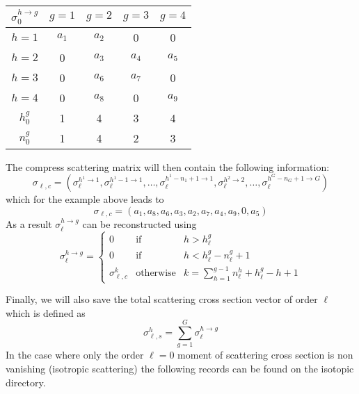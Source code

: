 \begin{center}
\begin{tabular}{c||cccc}
$\sigma_{0}^{h\to g}$ &$g=1$   & $g=2$   & $g=3$   & $g=4$    \\ \hline\hline
$h=1$                 & $a_{1}$ & $a_{2}$ & 0       & 0        \\
$h=2$                 & 0       & $a_{3}$ & $a_{4}$ & $a_{5}$  \\
$h=3$                 & 0       & $a_{6}$ & $a_{7}$ & 0        \\
$h=4$                 & 0       & $a_{8}$ & 0       & $a_{9}$  \\ \hline\hline
$h_{0}^{g}$           & 1       & 4       & 3       & 4       \\
$n_{0}^{g}$           & 1       & 4       & 2       & 3        \\
\end{tabular}
\end{center}

The compress scattering matrix will then contain the following information:
  \begin{displaymath}
    \sigma_{\ell,c}=\left(\sigma_{\ell}^{h^{1}\to 1},\sigma_{\ell}^{h^{1}-1\to 1},
    \ldots,\sigma_{\ell}^{h^{1}-n_{1}+1\to 1},\sigma_{\ell}^{h^{2}\to
    2},\ldots,\sigma_{\ell}^{h^{G}-n_{G}+1\to G}\right)
  \end{displaymath}
which for the example above leads to
  \begin{displaymath}
    \sigma_{\ell,c}=\left(a_{1},a_{8},a_{6},
                     a_{3},a_{2},a_{7},a_{4},a_{9},0,a_{5}\right)
  \end{displaymath}
As a result $\sigma_{\ell}^{h\to g}$ can be
reconstructed using 
\begin{displaymath}
\sigma_{\ell}^{h\to g} = \left\{
\begin{array}{lll}
0 & \textrm{if} & h > h_{\ell}^{g}\\
0 & \textrm{if} & h < h_{\ell}^{g}-n_{\ell}^{g}+1\\
\sigma_{\ell,c}^{k} & \textrm{otherwise} & k=\sum_{h=1}^{g-1} n_{\ell}^{h} +
h_{\ell}^{g}-h+1
\end{array} \right.
\end{displaymath}

Finally, we will also save the total scattering cross section vector of order
$\ell$ which is defined as 
  \begin{displaymath}
    \sigma_{\ell,s}^{h}=\sum_{g=1}^{G} \sigma_{\ell}^{h\to g}
  \end{displaymath}
In the case where only the order $\ell=0$ moment of scattering cross section is non
vanishing (isotropic scattering) the following records can be found on the
isotopic directory.

